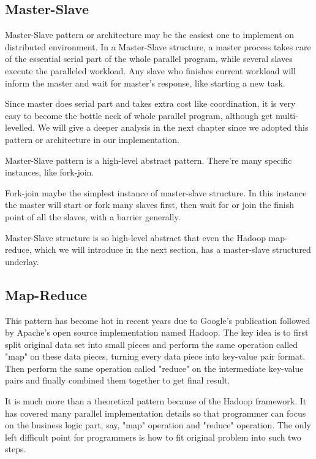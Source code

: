 \documentclass[12pt,a4]{report}
\begin{document}
\subsection{Master-Slave}

Master-Slave pattern or architecture may be the easiest one to implement on distributed environment. In a Master-Slave structure, a master process takes care of the essential serial part of the whole parallel program, while several slaves execute the paralleled workload. Any slave who finishes current workload will inform the master and wait for master's response, like starting a new task.

Since master does serial part and takes extra cost like coordination, it is very easy to become the bottle neck of whole parallel program, although get multi-levelled. We will give a deeper analysis in the next chapter since we adopted this pattern or architecture in our implementation.

Master-Slave pattern is a high-level abstract pattern. There're many specific instances, like fork-join. 

Fork-join maybe the simplest instance of master-slave structure. In this instance the master will start or fork many slaves first, then wait for or join the finish point of all the slaves, with a barrier generally.

Master-Slave structure is so high-level abstract that even the Hadoop map-reduce, which we will introduce in the next section, has a master-slave structured underlay.

\subsection{Map-Reduce}

This pattern has become hot in recent years due to Google's publication \cite{google-map-reduce} followed by Apache's open source implementation named Hadoop. The key idea is to first split original data set into small pieces and perform the same operation called "map" on these data pieces, turning every data piece into key-value pair format. Then perform the same operation called "reduce" on the intermediate key-value pairs and finally combined them together to get final result.

It is much more than a theoretical pattern because of the Hadoop framework. It has covered many parallel implementation details so that programmer can focus on the business logic part, say, "map" operation and "reduce" operation. The only left difficult point for programmers is how to fit original problem into such two steps.
\end{document}
